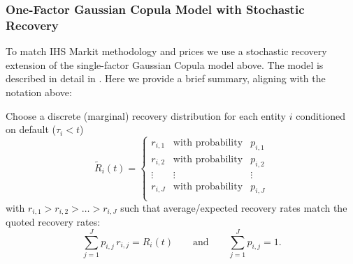 \subsubsection*{One-Factor Gaussian Copula Model with Stochastic Recovery}

To match IHS Markit methodology and prices we use a stochastic recovery extension of the
single-factor Gaussian Copula model above. The model is described in detail in 
\cite{Krekel_2008}. Here we provide a brief summary, aligning with the notation above:

Choose a discrete (marginal) recovery distribution for each entity $i$
conditioned on default ($\tau_i < t$)
$$
\widetilde R_i(t) = \left\{
\begin{array}{ccc} 
  r_{i,1} & \mbox{with probability} & p_{i,1} \\
  r_{i,2} & \mbox{with probability} & p_{i,2} \\
  \vdots & \vdots & \vdots \\
  r_{i,J} & \mbox{with probability} & p_{i,J} \\
\end{array}
  \right.
$$
with $r_{i,1} > r_{i,2} > \dots > r_{i,J}$
such that average/expected recovery rates match the quoted recovery rates:
$$  
\sum_{j=1}^J p_{i,j}\,r_{i,j} = R_i(t)
\qquad \mbox{and} \qquad
\sum_{j=1}^J p_{i,j} = 1.
$$

